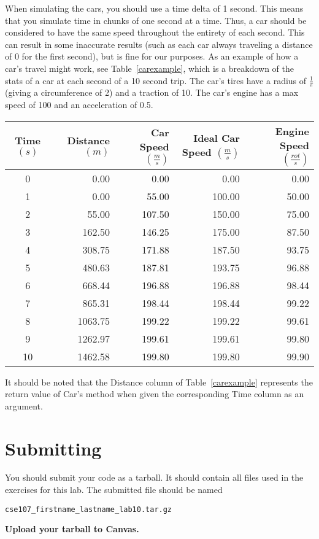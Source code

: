 \documentclass[11pt]{cselabheader}
\begin{document}
\begin{ex}
  When simulating the cars, you should use a time delta of 1 second. This means
  that you simulate time in chunks of one second at a time. Thus, a car should
  be considered to have the same speed throughout the entirety of each second.
  This can result in some inaccurate results (such as each car always
  traveling a distance of 0 for the first second), but is fine for our
  purposes. As an example of how a car's travel might work, see
  Table~\ref{carexample}, which is a breakdown of the stats of a car at each
  second of a 10 second trip. The car's tires have a radius of $\frac{1}{\pi}$
  (giving a circumference of 2) and a traction of 10. The car's engine has a
  max speed of 100 and an acceleration of 0.5.
  
  \begin{center}
    \begin{tabular}{crrrr}
    \toprule
    Time $(s)$ & Distance $(m)$ & Car Speed $(\frac{m}{s})$ &
    Ideal Car Speed $(\frac{m}{s})$ & Engine Speed $(\frac{rot}{s})$\\
    \midrule
    0  &    0.00 &   0.00 &   0.00 &  0.00\\
    1  &    0.00 &  55.00 & 100.00 & 50.00\\
    2  &   55.00 & 107.50 & 150.00 & 75.00\\
    3  &  162.50 & 146.25 & 175.00 & 87.50\\
    4  &  308.75 & 171.88 & 187.50 & 93.75\\
    5  &  480.63 & 187.81 & 193.75 & 96.88\\
    6  &  668.44 & 196.88 & 196.88 & 98.44\\
    7  &  865.31 & 198.44 & 198.44 & 99.22\\
    8  & 1063.75 & 199.22 & 199.22 & 99.61\\
    9  & 1262.97 & 199.61 & 199.61 & 99.80\\
    10 & 1462.58 & 199.80 & 199.80 & 99.90\\
    \bottomrule
    \end{tabular}
    \label{carexample}
  \end{center}
  
  It should be noted that the Distance column of Table~\ref{carexample}
  represents the return value of Car's
   method when given the
  corresponding Time column as an argument.
\end{ex}

\pagebreak
\section{Submitting}
You should submit your code as a tarball. It should contain all files
used in the exercises for this lab. The submitted file should be named
\begin{center}
  \texttt{cse107\_firstname\_lastname\_lab10.tar.gz}
\end{center}

\begin{center}
  \textbf{Upload your tarball to Canvas.}
\end{center}

\listoftheorems
\end{document}
